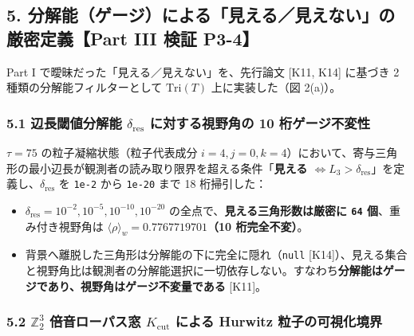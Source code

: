 \documentclass[
  a4paper,
]{ltjsarticle}
\providecommand{\tightlist}{%
  \setlength{\itemsep}{0pt}\setlength{\parskip}{0pt}}
\begin{document}
\subsection{5.
分解能（ゲージ）による「見える／見えない」の厳密定義【Part III 検証
P3-4】}\label{ux5206ux89e3ux80fdux30b2ux30fcux30b8ux306bux3088ux308bux898bux3048ux308bux898bux3048ux306aux3044ux306eux53b3ux5bc6ux5b9aux7fa9part-iii-ux691cux8a3c-p3-4}

Part I で曖昧だった「見える／見えない」を、先行論文 {[}K11, K14{]}
に基づき 2 種類の分解能フィルターとして \(\mathrm{Tri}(T)\)
上に実装した（図 2(a)）。

\subsubsection{\texorpdfstring{5.1 辺長閾値分解能
\(\delta_{\mathrm{res}}\) に対する視野角の 10
桁ゲージ不変性}{5.1 辺長閾値分解能 \textbackslash delta\_\{\textbackslash mathrm\{res\}\} に対する視野角の 10 桁ゲージ不変性}}\label{ux8fbaux9577ux95beux5024ux5206ux89e3ux80fd-delta_mathrmres-ux306bux5bfeux3059ux308bux8996ux91ceux89d2ux306e-10-ux6841ux30b2ux30fcux30b8ux4e0dux5909ux6027}

\(\tau = 75\) の粒子凝縮状態（粒子代表成分
\(i=4, j=0, k=4\)）において、寄与三角形の最小辺長が観測者の読み取り限界を超える条件「\textbf{見える
\(\iff L_3 > \delta_{\mathrm{res}}\)}」を定義し、\(\delta_{\mathrm{res}}\)
を \texttt{1e-2} から \texttt{1e-20} まで 18 桁掃引した：

\begin{itemize}
\tightlist
\item
  \(\delta_{\mathrm{res}} = 10^{-2}, 10^{-5}, 10^{-10}, 10^{-20}\)
  の全点で、\textbf{見える三角形数は厳密に \texttt{64}
  個}、重み付き視野角は
  \textbf{\(\langle\rho\rangle_w = 0.7767719701\)（10 桁完全不変）}。
\item
  背景へ離脱した三角形は分解能の下に完全に隠れ（\texttt{null}
  {[}K14{]}）、見える集合と視野角比は観測者の分解能選択に一切依存しない。すなわち\textbf{分解能はゲージであり、視野角はゲージ不変量である}
  {[}K11{]}。
\end{itemize}

\subsubsection{\texorpdfstring{5.2 \(\mathbb{Z}_2^3\) 倍音ローパス窓
\(K_{\mathrm{cut}}\) による Hurwitz
粒子の可視化境界}{5.2 \textbackslash mathbb\{Z\}\_2\^{}3 倍音ローパス窓 K\_\{\textbackslash mathrm\{cut\}\} による Hurwitz 粒子の可視化境界}}\label{mathbbz_23-ux500dux97f3ux30edux30fcux30d1ux30b9ux7a93-k_mathrmcut-ux306bux3088ux308b-hurwitz-ux7c92ux5b50ux306eux53efux8996ux5316ux5883ux754c}
\end{document}

